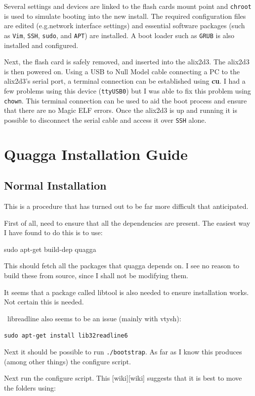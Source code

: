  Several settings and devices are linked to the flash cards mount point and
 \texttt{chroot} is used to simulate booting into the new install. The required
 configuration files are edited (e.g.\@ network interface settings) and essential
 software packages (such as \texttt{Vim}, \texttt{SSH}, \texttt{sudo}, and
 \texttt{APT}) are installed. A boot loader such as \texttt{GRUB} is also
 installed and configured.

 Next, the flash card is safely removed, and  inserted into the alix2d3. The
 alix2d3 is then powered on. Using a USB to Null Model cable connecting a PC to
 the alix2d3's serial port, a terminal connection can be established using {\bf
 cu}. I had a few problems using this device (\texttt{ttyUSB0}) but I was able to
 fix this problem using \texttt{chown}. This terminal connection can be used to
 aid the boot process and ensure that there are no Magic ELF errors. Once the
 alix2d3 is up and running it is possible to disconnect the serial cable and
 access it over \texttt{SSH} alone.

 \section{Quagga Installation Guide}

 \subsection{Normal Installation}
This is a procedure that has  turned out to be far more difficult that anticipated.

First of all, need to ensure that all the dependencies are present. The easiest
way I have found to do this is to use:

sudo apt-get build-dep quagga

This should fetch all the packages that quagga depends on. I see no reason to
build these from source, since I shall not be modifying them.

It seems that a package called libtool is also needed to ensure installation works.
Not certain this is needed.

\ libreadline also seems to be an issue (mainly with vtysh):

\texttt{sudo apt-get install lib32readline6}

Next it should be possible to run \texttt{\@./bootstrap}. As far as I know this
produces (among other things) the configure script.

Next run the configure script. This [wiki][wiki] suggests that it is best to
move the folders using:

